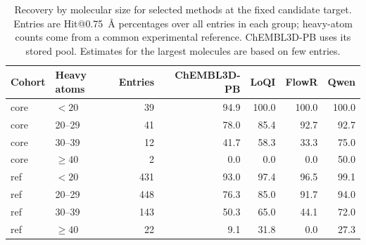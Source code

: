 \begin{table}[htbp]
\centering
\small
\setlength{\tabcolsep}{5pt}
\caption{Recovery by molecular size for selected methods at the fixed candidate target. Entries are Hit@0.75~\AA{} percentages over all entries in each group; heavy-atom counts come from a common experimental reference. ChEMBL3D-PB uses its stored pool. Estimates for the largest molecules are based on few entries.}
\label{tab:size}
\begin{tabular}{llrrrrr}
\hline
Cohort & Heavy atoms & Entries & ChEMBL3D-PB & LoQI & FlowR & Qwen \\
\hline
core & $<20$ & 39 & 94.9 & 100.0 & 100.0 & 100.0 \\
core & 20--29 & 41 & 78.0 & 85.4 & 92.7 & 92.7 \\
core & 30--39 & 12 & 41.7 & 58.3 & 33.3 & 75.0 \\
core & $\geq40$ & 2 & 0.0 & 0.0 & 0.0 & 50.0 \\
\hline
ref & $<20$ & 431 & 93.0 & 97.4 & 96.5 & 99.1 \\
ref & 20--29 & 448 & 76.3 & 85.0 & 91.7 & 94.0 \\
ref & 30--39 & 143 & 50.3 & 65.0 & 44.1 & 72.0 \\
ref & $\geq40$ & 22 & 9.1 & 31.8 & 0.0 & 27.3 \\
\hline
\end{tabular}
\end{table}

